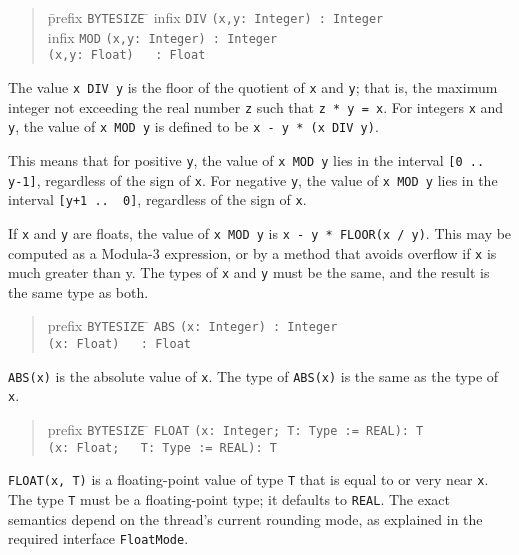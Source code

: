 \documentclass[10pt]{article}
\begin{document}
\begin{quote}
  \begin{tabbing}
    \=prefix \= \verb|BYTESIZE| \= \kill
    \>infix  \> \verb|DIV|     \> \verb|(x,y: Integer) : Integer| \\
    \>infix  \> \verb|MOD|     \> \verb|(x,y: Integer) : Integer| \\
    \>       \>                \> \verb|(x,y: Float)   : Float|
  \end{tabbing}
\end{quote}
The value \verb|x DIV y| is the floor of the quotient of \verb|x| and
\verb|y|; that is, the maximum integer not exceeding the real number \verb|z|
such that \verb|z * y = x|.  For integers \verb|x| and \verb|y|, the value of
\verb|x MOD y| is defined to be \verb|x - y * (x DIV y)|.

This means that for positive \verb|y|, the value of \verb|x MOD y| lies in the
interval \verb|[0 ..  y-1]|, regardless of the sign of \verb|x|.  For negative
\verb|y|, the value of \verb|x MOD y| lies in the interval \verb|[y+1 ..  0]|,
regardless of the sign of \verb|x|.

If \verb|x| and \verb|y| are floats, the value of \verb|x MOD y| is
\verb|x - y * FLOOR(x / y)|.  This may be computed as a Modula-3 expression,
or by a method that avoids overflow if \verb|x| is much greater than y.  The
types of \verb|x| and \verb|y| must be the same, and the result is the same
type as both.

\begin{quote}
  \begin{tabbing}
    prefix \= \verb|BYTESIZE| \= \kill
           \> \verb|ABS|     \> \verb|(x: Integer) : Integer| \\
           \>                \> \verb|(x: Float)   : Float|
  \end{tabbing}
\end{quote}
\verb|ABS(x)| is the absolute value of \verb|x|.  The type of \verb|ABS(x)| is
the same as the type of \verb|x|.

\begin{quote}
  \begin{tabbing}
    prefix \= \verb|BYTESIZE| \= \kill
           \> \verb|FLOAT|   \> \verb|(x: Integer; T: Type := REAL): T| \\
           \>                \> \verb|(x: Float;   T: Type := REAL): T|
  \end{tabbing}
\end{quote}
\verb|FLOAT(x, T)| is a floating-point value of type \verb|T| that is equal to
or very near \verb|x|.  The type \verb|T| must be a floating-point type; it
defaults to \verb|REAL|.  The exact semantics depend on the thread's current
rounding mode, as explained in the required interface \verb|FloatMode|.
\end{document}
